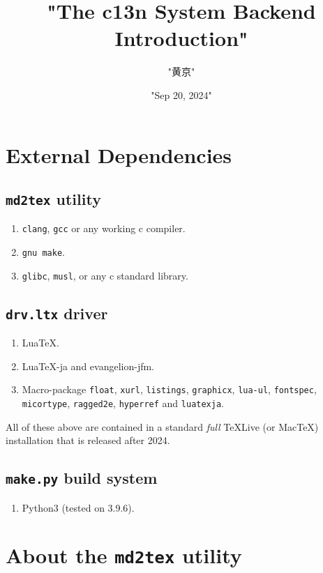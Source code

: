 \title{"The c13n System Backend Introduction"}
\author{"黄京"}
\date{"Sep 20, 2024"}
\maketitle
\chapter{External Dependencies}
\section{\texttt{md2tex} utility}
\begin{enumerate}
\item \verb!clang!, \verb!gcc! or any working c compiler.
\item \verb!gnu make!.
\item \verb!glibc!, \verb!musl!, or any c standard library.
\end{enumerate}
\section{\texttt{drv.ltx} driver}
\begin{enumerate}
\item LuaTeX.
\item LuaTeX-ja and evangelion-jfm.
\item Macro-package \verb!float!, \verb!xurl!, \verb!listings!, \verb!graphicx!, \verb!lua-ul!, \verb!fontspec!, \verb!micortype!, \verb!ragged2e!, \verb!hyperref! and \verb!luatexja!.
\end{enumerate}
All of these above are contained in a standard \textit{full} TeXLive (or MacTeX) installation that is released after 2024.\par
\section{\texttt{make.py} build system}
\begin{enumerate}
\item Python3 (tested on 3.9.6).
\end{enumerate}
\chapter{About the \texttt{md2tex} utility}
